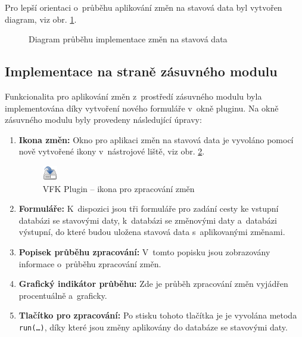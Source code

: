 \documentclass[a4paper,12pt,oneside]{book}
\begin{document}
Pro lepší orientaci o~průběhu aplikování změn na stavová data byl vytvořen diagram, viz obr. \ref{l_zmeny_diagram}.

\begin{figure}
  \centering
  
  \caption{Diagram průběhu implementace změn na stavová data}
  \label{l_zmeny_diagram}
\end{figure}


\newpage
\subsection{Implementace na straně zásuvného modulu}
\label{l_implementace_zmen}
Funkcionalita pro aplikování změn z~prostředí zásuvného modulu byla implementována díky vytvoření nového formuláře v~okně pluginu. Na okně zásuvného modulu byly provedeny následující úpravy:

\begin{enumerate}
 \item \textbf{Ikona změn:} Okno pro aplikaci změn na stavová data je vyvoláno pomocí nově vytvořené ikony v~nástrojové liště, viz obr. \ref{l_ikona_zmen}.

\begin{figure}[htb]
\centering
\includegraphics[scale=0.9]{images/applyChanges.png}
\caption[VFK Plugin -- ikona pro zpracování změn]{VFK Plugin -- ikona pro zpracování změn}
\label{l_ikona_zmen}
\end{figure} 
 
 \item \textbf{Formuláře:} K~dispozici jsou tři formuláře pro zadání cesty ke vstupní databázi se stavovými daty, k~databázi se změnovými daty a~databázi výstupní, do které budou uložena stavová data s~aplikovanými změnami.
 
 \item \textbf{Popisek průběhu zpracování:} V~tomto popisku jsou zobrazovány informace o~průběhu zpracování změn.
 
 \item \textbf{Grafický indikátor průběhu:} Zde je průběh zpracování změn vyjádřen procentuálně a~graficky.
 
 \item \textbf{Tlačítko pro zpracování:} Po stisku tohoto tlačítka je je vyvolána metoda \texttt{run(\dots)}, díky které jsou změny aplikovány do databáze se stavovými daty.
 
\end{enumerate}
\end{document}
